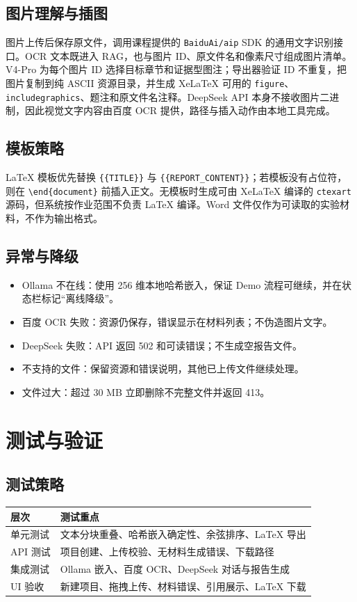 \documentclass[12pt,a4paper]{ctexart}
\begin{document}
\subsection{图片理解与插图}
图片上传后保存原文件，调用课程提供的 \texttt{BaiduAi/aip} SDK 的通用文字识别接口。OCR 文本既进入 RAG，也与图片 ID、原文件名和像素尺寸组成图片清单。V4-Pro 为每个图片 ID 选择目标章节和证据型图注；导出器验证 ID 不重复，把图片复制到纯 ASCII 资源目录，并生成 XeLaTeX 可用的 \texttt{figure}、\texttt{includegraphics}、题注和原文件名注释。DeepSeek API 本身不接收图片二进制，因此视觉文字内容由百度 OCR 提供，路径与插入动作由本地工具完成。

\subsection{模板策略}
LaTeX 模板优先替换 \texttt{\{\{TITLE\}\}} 与 \texttt{\{\{REPORT\_CONTENT\}\}}；若模板没有占位符，则在 \texttt{\textbackslash{}end\{document\}} 前插入正文。无模板时生成可由 XeLaTeX 编译的 \texttt{ctexart} 源码，但系统按作业范围不负责 LaTeX 编译。Word 文件仅作为可读取的实验材料，不作为输出格式。

\subsection{异常与降级}
\begin{itemize}
\item Ollama 不在线：使用 256 维本地哈希嵌入，保证 Demo 流程可继续，并在状态栏标记“离线降级”。
\item 百度 OCR 失败：资源仍保存，错误显示在材料列表；不伪造图片文字。
\item DeepSeek 失败：API 返回 502 和可读错误；不生成空报告文件。
\item 不支持的文件：保留资源和错误说明，其他已上传文件继续处理。
\item 文件过大：超过 30 MB 立即删除不完整文件并返回 413。
\end{itemize}
\section{测试与验证}
\subsection{测试策略}
\begin{table}[H]
\centering\small
\begin{tabularx}{\textwidth}{|X|X|}
\hline
\textbf{层次} & \textbf{测试重点} \\ \hline
单元测试 & 文本分块重叠、哈希嵌入确定性、余弦排序、LaTeX 导出 \\ \hline
API 测试 & 项目创建、上传校验、无材料生成错误、下载路径 \\ \hline
集成测试 & Ollama 嵌入、百度 OCR、DeepSeek 对话与报告生成 \\ \hline
UI 验收 & 新建项目、拖拽上传、材料错误、引用展示、LaTeX 下载 \\ \hline
\end{tabularx}
\end{table}
\end{document}
